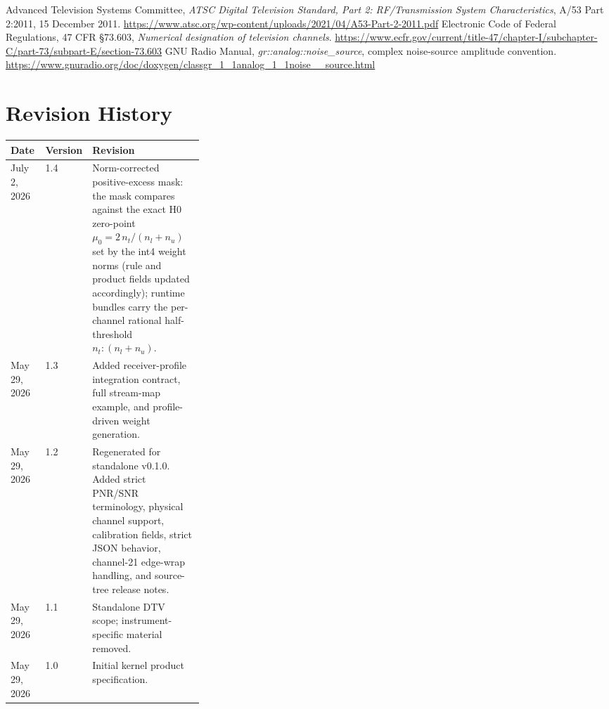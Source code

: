 \documentclass[10pt,letterpaper]{article}
\newcommand{\code}[1]{\texttt{\detokenize{#1}}}
\begin{document}
\begin{thebibliography}{9}
 Advanced Television Systems Committee, \emph{ATSC Digital Television Standard, Part 2: RF/Transmission System Characteristics}, A/53 Part 2:2011, 15 December 2011. \url{https://www.atsc.org/wp-content/uploads/2021/04/A53-Part-2-2011.pdf}
 Electronic Code of Federal Regulations, 47 CFR \S 73.603, \emph{Numerical designation of television channels}. \url{https://www.ecfr.gov/current/title-47/chapter-I/subchapter-C/part-73/subpart-E/section-73.603}
 GNU Radio Manual, \emph{gr::analog::noise\_source}, complex noise-source amplitude convention. \url{https://www.gnuradio.org/doc/doxygen/classgr_1_1analog_1_1noise__source.html}
\end{thebibliography}

\section{Revision History}
\begin{tabularx}{\linewidth}{|L{0.18\linewidth}|L{0.14\linewidth}|Y|}
\hline
\textbf{Date} & \textbf{Version} & \textbf{Revision}\\ \hline
July 2, 2026 & 1.4 & Norm-corrected positive-excess mask: the mask compares against the exact H0 zero-point $\mu_0 = 2\,n_t/(n_l+n_u)$ set by the int4 weight norms (rule and product fields updated accordingly); runtime bundles carry the per-channel rational half-threshold $n_t:(n_l+n_u)$.\\ \hline
May 29, 2026 & 1.3 & Added receiver-profile integration contract, full stream-map example, and profile-driven weight generation.\\ \hline
May 29, 2026 & 1.2 & Regenerated for standalone \code{pilot-proxy} v0.1.0.  Added strict PNR/SNR terminology, physical channel support, calibration fields, strict JSON behavior, channel-21 edge-wrap handling, and source-tree release notes.\\ \hline
May 29, 2026 & 1.1 & Standalone DTV scope; instrument-specific material removed.\\ \hline
May 29, 2026 & 1.0 & Initial kernel product specification.\\ \hline
\end{tabularx}
\end{document}
